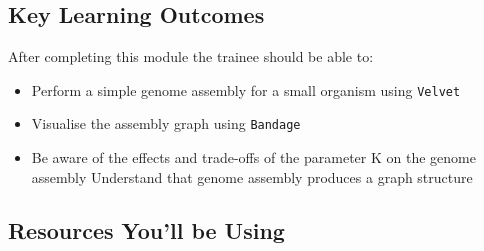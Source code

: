 
\chapter{\moduleTitle}
\newpage


\section{Key Learning Outcomes}

After completing this module the trainee should be able to:
\begin{itemize}
  \item Perform a simple genome assembly for a small organism using \texttt{Velvet}
  \item Visualise the assembly graph using \texttt{Bandage}
  \item Be aware of the effects and trade-offs of the parameter K on the genome assembly
  \teim Understand that genome assembly produces a graph structure
\end{itemize}

\section{Resources You'll be Using}
 
